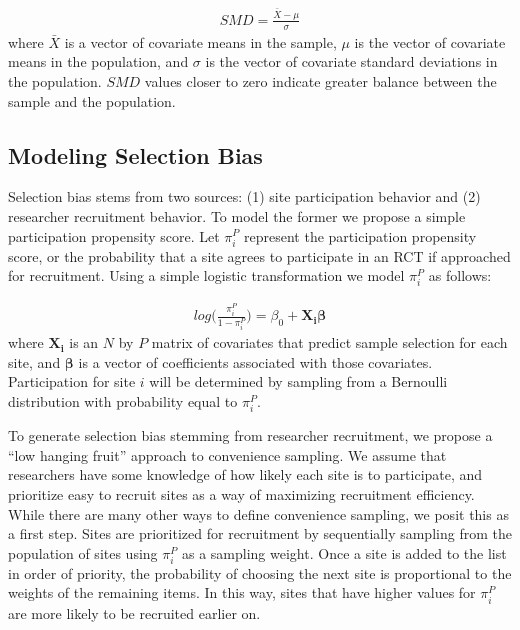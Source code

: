 \documentclass[man,floatsintext]{apa6}
\begin{document}
\begin{align}
  SMD = \frac{\bar{X}-\mu}{\sigma}
\end{align}
where \(\bar{X}\) is a vector of covariate means in the sample, \(\mu\) is the vector of covariate means in the population, and \(\sigma\) is the vector of covariate standard deviations in the population. \(SMD\) values closer to zero indicate greater balance between the sample and the population.

\hypertarget{modeling-selection-bias}{%
\subsection{Modeling Selection Bias}\label{modeling-selection-bias}}

Selection bias stems from two sources: (1) site participation behavior and (2) researcher recruitment behavior. To model the former we propose a simple participation propensity score. Let \(\pi^P_i\) represent the participation propensity score, or the probability that a site agrees to participate in an RCT if approached for recruitment. Using a simple logistic transformation we model \(\pi^P_i\) as follows:

\begin{align} \label{eq:RGM}
  log\bigg(\frac{\pi^P_i}{1 - \pi^P_i}\bigg) = \beta_0 + \boldsymbol{X_i \beta}
\end{align}
where \(\boldsymbol{X_i}\) is an \(N\) by \(P\) matrix of covariates that predict sample selection for each site, and \(\boldsymbol{\beta}\) is a vector of coefficients associated with those covariates. Participation for site \(i\) will be determined by sampling from a Bernoulli distribution with probability equal to \(\pi^P_i\).

To generate selection bias stemming from researcher recruitment, we propose a \enquote{low hanging fruit} approach to convenience sampling. We assume that researchers have some knowledge of how likely each site is to participate, and prioritize easy to recruit sites as a way of maximizing recruitment efficiency. While there are many other ways to define convenience sampling, we posit this as a first step. Sites are prioritized for recruitment by sequentially sampling from the population of sites using \(\pi^P_i\) as a sampling weight. Once a site is added to the list in order of priority, the probability of choosing the next site is proportional to the weights of the remaining items. In this way, sites that have higher values for \(\pi^P_i\) are more likely to be recruited earlier on.
\end{document}
